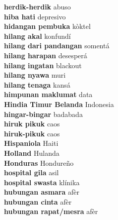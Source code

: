 \textbf{ herdik-herdik  } abuso \\
\textbf{ hiba hati  } depresivo \\
\textbf{ hidangan pembuka  } kòktel \\
\textbf{ hilang akal  } konfundí \\
\textbf{ hilang dari pandangan  } somentá \\
\textbf{ hilang harapan  } desesperá \\
\textbf{ hilang ingatan  } blackout \\
\textbf{ hilang nyawa  } muri \\
\textbf{ hilang tenaga  } kansá \\
\textbf{ himpunan maklumat  } data \\
\textbf{ Hindia Timur Belanda  } Indonesia \\
\textbf{ hingar-bingar  } badabada \\
\textbf{ hiruk pikuk  } caos \\
\textbf{ hiruk-pikuk  } caos \\
\textbf{ Hispaniola  } Haiti \\
\textbf{ Holland  } Hulanda \\
\textbf{ Honduras  } Hondureño \\
\textbf{ hospital gila  } asil \\
\textbf{ hospital swasta  } klínika \\
\textbf{ hubungan asmara  } afèr \\
\textbf{ hubungan cinta  } afèr \\
\textbf{ hubungan rapat/mesra  } afèr \\
